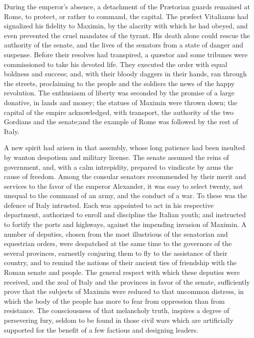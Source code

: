 

During the emperor’s absence, a detachment of the Prætorian
guards remained at Rome, to protect, or rather to command, the
capital. The præfect Vitalianus had signalized his fidelity to
Maximin, by the alacrity with which he had obeyed, and even
prevented the cruel mandates of the tyrant. His death alone could
rescue the authority of the senate, and the lives of the senators
from a state of danger and suspense. Before their resolves had
transpired, a quæstor and some tribunes were commissioned to take
his devoted life. They executed the order with equal boldness and
success; and, with their bloody daggers in their hands, ran
through the streets, proclaiming to the people and the soldiers
the news of the happy revolution. The enthusiasm of liberty was
seconded by the promise of a large donative, in lands and money;
the statues of Maximin were thrown down; the capital of the
empire acknowledged, with transport, the authority of the two
Gordians and the senate;\footnotemark[24] and the example of Rome was followed
by the rest of Italy.


A new spirit had arisen in that assembly, whose long patience had
been insulted by wanton despotism and military license. The
senate assumed the reins of government, and, with a calm
intrepidity, prepared to vindicate by arms the cause of freedom.
Among the consular senators recommended by their merit and
services to the favor of the emperor Alexander, it was easy to
select twenty, not unequal to the command of an army, and the
conduct of a war. To these was the defence of Italy intrusted.
Each was appointed to act in his respective department,
authorized to enroll and discipline the Italian youth; and
instructed to fortify the ports and highways, against the
impending invasion of Maximin. A number of deputies, chosen from
the most illustrious of the senatorian and equestrian orders,
were despatched at the same time to the governors of the several
provinces, earnestly conjuring them to fly to the assistance of
their country, and to remind the nations of their ancient ties of
friendship with the Roman senate and people. The general respect
with which these deputies were received, and the zeal of Italy
and the provinces in favor of the senate, sufficiently prove that
the subjects of Maximin were reduced to that uncommon distress,
in which the body of the people has more to fear from oppression
than from resistance. The consciousness of that melancholy truth,
inspires a degree of persevering fury, seldom to be found in
those civil wars which are artificially supported for the benefit
of a few factious and designing leaders.\footnotemark[25]

